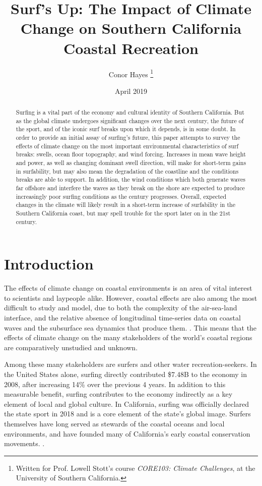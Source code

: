 \documentclass[12pt, letterpaper]{article}
\title{Surf's Up: The Impact of Climate Change on Southern California Coastal Recreation}
\author{Conor Hayes \thanks{Written for Prof. Lowell Stott's course \textit{CORE103: Climate Challenges}, at the University of Southern California.}}
\date{April 2019}
\begin{document}
	\maketitle

	\begin{abstract}
		Surfing is a vital part of the economy and cultural identity of Southern California. But as the global climate undergoes significant changes over the next century, the future of the sport, and of the iconic surf breaks upon which it depends, is in some doubt. In order to provide an initial assay of surfing's future, this paper attempts to survey the effects of climate change on the most important environmental characteristics of surf breaks: swells, ocean floor topography, and wind forcing. Increases in mean wave height and power, as well as changing dominant swell direction, will make for short-term gains in surfability, but may also mean the degradation of the coastline and the conditions breaks are able to support. In addition, the wind conditions which both generate waves far offshore and interfere the waves as they break on the shore are expected to produce increasingly poor surfing conditions as the century progresses. Overall, expected changes in the climate will likely result in a short-term increase of surfability in the Southern California coast, but may spell trouble for the sport later on in the 21st century.
	\end{abstract}

	\section{Introduction}
	The effects of climate change on coastal environments is an area of vital interest to scientists and laypeople alike. However, coastal effects are also among the most difficult to study and model, due to both the complexity of the air-sea-land interface, and the relative absence of longitudinal time-series data on coastal waves and the subsurface sea dynamics that produce them. \citep{swells-deep-water-waves}. This means that the effects of climate change on the many stakeholders of the world's coastal regions are comparatively unstudied and unknown. \citep{swells-deep-water-waves}

	Among these many stakeholders are surfers and other water recreation-seekers. In the United States alone, surfing directly contributed \$7.48B to the economy in 2008, after increasing 14\% over the previous 4 years. \citep{surfing-value-to-society} In addition to this measurable benefit, surfing contributes to the economy indirectly as a key element of local and global culture. In California, surfing was officially declared the state sport in 2018 \citep{surfing-official-sport} and is a core element of the state's global image. Surfers themselves have long served as stewards of the coastal oceans and local environments, and have founded many of California's early coastal conservation movements. \citep{surfing-official-sport}.
\end{document}
